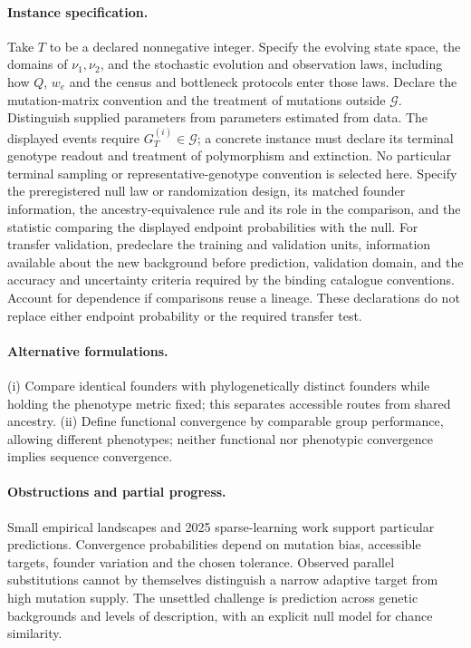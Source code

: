 \documentclass[11pt]{article}
\begin{document}
\paragraph{Instance specification.} Take $T$ to be a declared nonnegative integer. Specify the evolving state space, the domains of $\nu_1,\nu_2$, and the stochastic evolution and observation laws, including how $Q$, $w_e$ and the census and bottleneck protocols enter those laws. Declare the mutation-matrix convention and the treatment of mutations outside $\mathcal G$. Distinguish supplied parameters from parameters estimated from data. The displayed events require $G_T^{(i)}\in\mathcal G$; a concrete instance must declare its terminal genotype readout and treatment of polymorphism and extinction. No particular terminal sampling or representative-genotype convention is selected here. Specify the preregistered null law or randomization design, its matched founder information, the ancestry-equivalence rule and its role in the comparison, and the statistic comparing the displayed endpoint probabilities with the null. For transfer validation, predeclare the training and validation units, information available about the new background before prediction, validation domain, and the accuracy and uncertainty criteria required by the binding catalogue conventions. Account for dependence if comparisons reuse a lineage. These declarations do not replace either endpoint probability or the required transfer test.

\paragraph{Alternative formulations.} (i) Compare identical founders with phylogenetically distinct founders while holding the phenotype metric fixed; this separates accessible routes from shared ancestry. (ii) Define functional convergence by comparable group performance, allowing different phenotypes; neither functional nor phenotypic convergence implies sequence convergence.
\paragraph{Obstructions and partial progress.} Small empirical landscapes and 2025 sparse-learning work support particular predictions. Convergence probabilities depend on mutation bias, accessible targets, founder variation and the chosen tolerance. Observed parallel substitutions cannot by themselves distinguish a narrow adaptive target from high mutation supply. The unsettled challenge is prediction across genetic backgrounds and levels of description, with an explicit null model for chance similarity.
\end{document}
